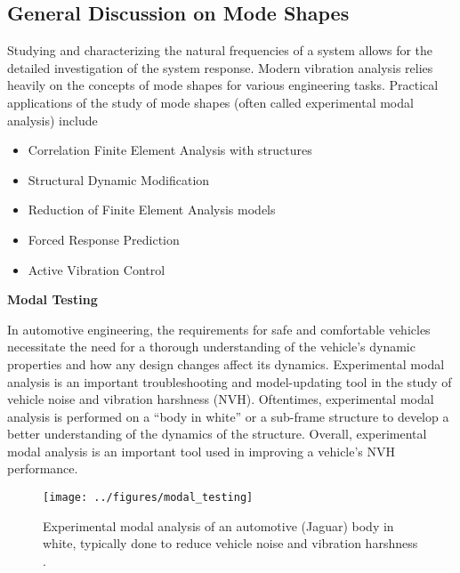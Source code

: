 \documentclass[12pt,letter]{article}
\begin{document}
	\subsection{General Discussion on Mode Shapes}
			\vspace{-1ex}
	
	Studying and characterizing the natural frequencies of a system allows for the detailed investigation of the system response. Modern vibration analysis relies heavily on the concepts of mode shapes for various engineering tasks. Practical applications of the study of mode shapes (often called experimental modal analysis) include
	\begin{itemize}
		\item Correlation Finite Element Analysis with structures
		\item Structural Dynamic Modification
		\item Reduction of Finite Element Analysis models
		\item Forced Response Prediction			
		\item Active Vibration Control	
	\end{itemize}


	\begin{vibration_case_study}
		\textbf{Modal Testing}
		
		\noindent In automotive engineering, the requirements for safe and comfortable vehicles necessitate the need for a thorough understanding of the vehicle's dynamic properties and how any design changes affect its dynamics. Experimental modal analysis is an important troubleshooting and model-updating tool in the study of vehicle noise and vibration harshness (NVH). Oftentimes, experimental modal analysis is performed on a ``body in white'' or a sub-frame structure to develop a better understanding of the dynamics of the structure. Overall, experimental modal analysis is an important tool used in improving a vehicle's NVH performance.
		\vspace{-3ex}
		\begin{figure}[H]
			\centering
			\texttt{[image: ../figures/modal\_testing]}
			\vspace{-1ex}
			\caption{Experimental modal analysis of an automotive (Jaguar) body in white, typically done to reduce vehicle noise and vibration harshness \protect\footnotemark[1].}
		\end{figure}
	\end{vibration_case_study}
	
\end{document}
